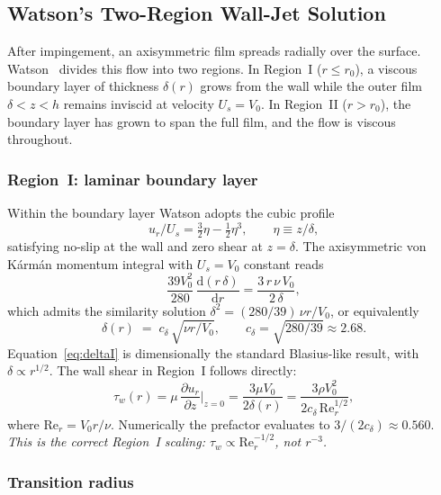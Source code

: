 \documentclass[10pt,letterpaper]{article}
\newcommand{\Rey}{\mathrm{Re}}
\newcommand{\dd}{\mathrm{d}}
\begin{document}
\subsection{Watson's Two-Region Wall-Jet Solution}

After impingement, an axisymmetric film spreads radially over the surface.
Watson~\citep{Watson1964} divides this flow into two regions. In Region~I
($r \leq r_0$), a viscous boundary layer of thickness $\delta(r)$ grows
from the wall while the outer film $\delta < z < h$ remains inviscid at
velocity $U_s = V_0$. In Region~II ($r > r_0$), the boundary layer has
grown to span the full film, and the flow is viscous throughout.

\subsubsection{Region~I: laminar boundary layer}

Within the boundary layer Watson adopts the cubic profile
\begin{equation}
  u_r/U_s = \tfrac{3}{2}\eta - \tfrac{1}{2}\eta^3,
  \qquad \eta \equiv z/\delta,
  \label{eq:cubic}
\end{equation}
satisfying no-slip at the wall and zero shear at $z = \delta$. The
axisymmetric von Kármán momentum integral with $U_s = V_0$ constant reads
\begin{equation}
  \frac{39 V_0^2}{280} \,\frac{\dd(r\,\delta)}{\dd r}
  = \frac{3\,r\,\nu\,V_0}{2\,\delta},
  \label{eq:karman}
\end{equation}
which admits the similarity solution $\delta^2 = (280/39)\,\nu r/V_0$,
or equivalently
\begin{equation}
  \boxed{\;\delta(r) \;=\; c_\delta\,\sqrt{\nu r/V_0},
  \qquad c_\delta = \sqrt{280/39} \approx 2.68.\;}
  \label{eq:deltaI}
\end{equation}
Equation~\eqref{eq:deltaI} is dimensionally the standard Blasius-like
result, with $\delta \propto r^{1/2}$. The wall shear in Region~I follows
directly:
\begin{equation}
  \tau_w(r) = \mu\,\frac{\partial u_r}{\partial z}\bigg|_{z=0}
  = \frac{3\mu V_0}{2\delta(r)}
  = \frac{3\rho V_0^2}{2 c_\delta\,\Rey_r^{1/2}},
  \label{eq:tauI}
\end{equation}
where $\Rey_r = V_0 r/\nu$. Numerically the prefactor evaluates to
$3/(2 c_\delta) \approx 0.560$. \emph{This is the correct Region~I scaling:
$\tau_w \propto \Rey_r^{-1/2}$, not $r^{-3}$.}

\subsubsection{Transition radius}
\end{document}
